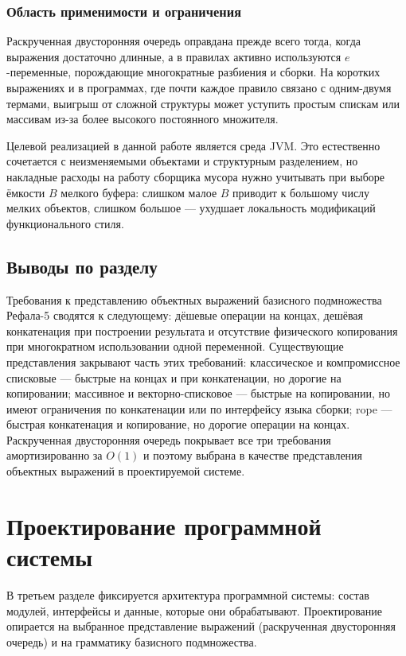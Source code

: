 \documentclass[14pt, russian]{scrartcl}
\begin{document}
\subsubsection{Область применимости и ограничения}

Раскрученная двусторонняя очередь оправдана прежде всего тогда, когда
выражения достаточно длинные, а в правилах активно используются
\(e\)-переменные, порождающие многократные разбиения и сборки. На
коротких выражениях и в программах, где почти каждое правило связано с
одним-двумя термами, выигрыш от сложной структуры может уступить простым
спискам или массивам из-за более высокого постоянного множителя.

Целевой реализацией в данной работе является среда JVM. Это естественно
сочетается с неизменяемыми объектами и структурным разделением, но
накладные расходы на работу сборщика мусора нужно учитывать при выборе
ёмкости \(B\) мелкого буфера: слишком малое \(B\) приводит к большому
числу мелких объектов, слишком большое --- ухудшает локальность
модификаций функционального стиля.

\subsection{Выводы по разделу}

Требования к представлению объектных выражений базисного подмножества
Рефала-5 сводятся к следующему: дёшевые операции на концах, дешёвая
конкатенация при построении результата и отсутствие физического
копирования при многократном использовании одной переменной. Существующие
представления закрывают часть этих требований: классическое и
компромиссное списковые --- быстрые на концах и при конкатенации, но
дорогие на копировании; массивное и векторно-списковое --- быстрые на
копировании, но имеют ограничения по конкатенации или по интерфейсу
языка сборки; rope --- быстрая конкатенация и копирование, но дорогие
операции на концах. Раскрученная двусторонняя очередь покрывает все три
требования амортизированно за \(O(1)\) и поэтому выбрана в качестве
представления объектных выражений в проектируемой системе.

\section{Проектирование программной системы}
\label{sec:design}

В третьем разделе фиксируется архитектура программной системы: состав модулей, интерфейсы и данные,
которые они обрабатывают. Проектирование опирается на выбранное представление выражений (раскрученная двусторонняя очередь)
и на грамматику базисного подмножества.
\end{document}
